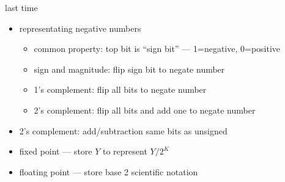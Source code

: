 \begin{comment}
\begin{frame}{last time}
    \begin{itemize}
    \item why bits and not base-10?
    \item endianness
    \item maximum unsigned integers
    \item started representing negative numbers
        \begin{itemize}
        \item key property: same bits as unsigned numbers if in range
        \item top bit becomes ``sign bit'' (1 if negative, 0 otherwise)
        \end{itemize}
    \end{itemize}
\end{frame}
\end{comment}

\begin{frame}{last time}
    \begin{itemize}
    \item representating negative numbers
    \begin{itemize}
    \item common property: top bit is ``sign bit'' --- 1=negative, 0=positive
    \item sign and magnitude: flip sign bit to negate number
    \item 1's complement: flip all bits to negate number
    \item 2's complement: flip all bits and add one to negate number
    \end{itemize}
    \item 2's complement: add/subtraction same bits as unsigned
    \item fixed point --- store $Y$ to represent $Y/2^K$
    \item floating point --- store base 2 scientific notation
    \end{itemize}
\end{frame}
